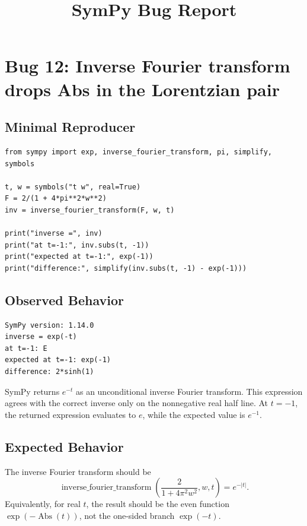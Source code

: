 \documentclass[11pt]{article}
\title{SymPy Bug Report}
\author{}
\date{}
\begin{document}
\maketitle

\section{Bug 12: Inverse Fourier transform drops Abs in the Lorentzian pair}

\subsection{Minimal Reproducer}

\medskip

\begin{lstlisting}[style=bugpython]
from sympy import exp, inverse_fourier_transform, pi, simplify, symbols

t, w = symbols("t w", real=True)
F = 2/(1 + 4*pi**2*w**2)
inv = inverse_fourier_transform(F, w, t)

print("inverse =", inv)
print("at t=-1:", inv.subs(t, -1))
print("expected at t=-1:", exp(-1))
print("difference:", simplify(inv.subs(t, -1) - exp(-1)))
\end{lstlisting}

\subsection{Observed Behavior}

\medskip

\begin{lstlisting}[style=bugpython]
SymPy version: 1.14.0
inverse = exp(-t)
at t=-1: E
expected at t=-1: exp(-1)
difference: 2*sinh(1)
\end{lstlisting}

SymPy returns \(e^{-t}\) as an unconditional inverse Fourier transform.  This
expression agrees with the correct inverse only on the nonnegative real half
line.  At \(t=-1\), the returned expression evaluates to \(e\), while the
expected value is \(e^{-1}\).

\subsection{Expected Behavior}

The inverse Fourier transform should be
\[
  \operatorname{inverse\_fourier\_transform}
  \left(\frac{2}{1+4\pi^2 w^2}, w, t\right)
  = e^{-|t|}.
\]
Equivalently, for real \(t\), the result should be the even function
\(\exp(-\operatorname{Abs}(t))\), not the one-sided branch \(\exp(-t)\).
\end{document}
